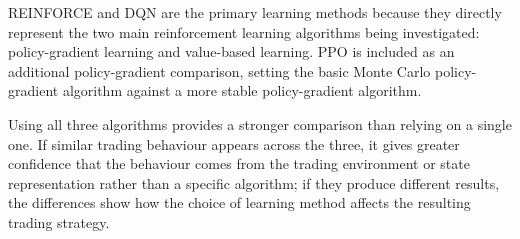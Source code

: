 REINFORCE and DQN are the primary learning methods because they directly
represent the two main reinforcement learning algorithms being
investigated: policy-gradient learning and value-based learning. PPO is
included as an additional policy-gradient comparison, setting the basic
Monte Carlo policy-gradient algorithm against a more stable
policy-gradient algorithm.

Using all three algorithms provides a stronger comparison than relying
on a single one. If similar trading behaviour appears across the three,
it gives greater confidence that the behaviour comes from the trading
environment or state representation rather than a specific algorithm; if
they produce different results, the differences show how the choice of
learning method affects the resulting trading strategy.
